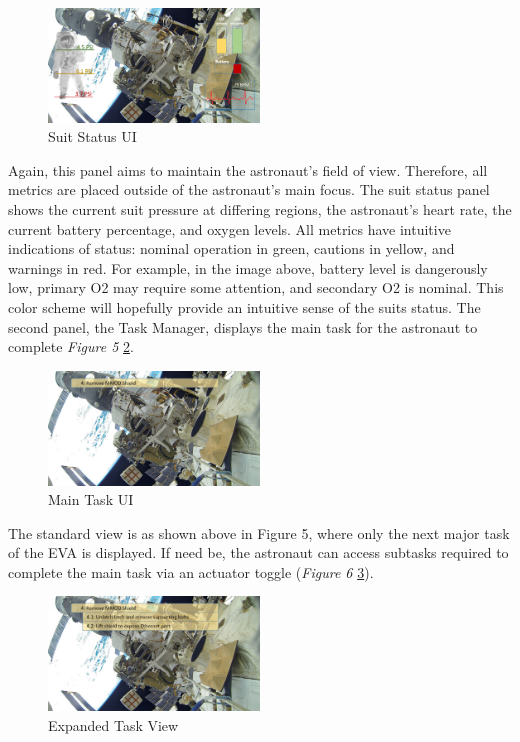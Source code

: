 \documentclass{article}
\begin{document}
\begin{figure}[!htb]
  \centering
  \includegraphics[width=0.5\textwidth]{assets/moresuitmetrics.png}
  \caption{Suit Status UI}
  \label{fig:moresuitmetrics}
\end{figure}

Again, this panel aims to maintain the astronaut’s field of view. 
Therefore, all metrics are placed outside of the astronaut’s main focus. 
The suit status panel shows the current suit pressure at differing 
regions, the astronaut’s heart rate, the current battery percentage, and 
oxygen levels. All metrics have intuitive indications of status: nominal 
operation in green, cautions in yellow, and warnings in red. For 
example, in the image above, battery level is dangerously low, primary 
O2 may require some attention, and secondary O2 is nominal. This color 
scheme will hopefully provide an intuitive sense of the suits status. 
The second panel, the Task Manager, displays the main task for the 
astronaut to complete \textit{Figure 5} \ref{fig:task4}.

\begin{figure}[!htb]
  \centering
  \includegraphics[width=0.5\textwidth]{assets/task4.png}
  \caption{Main Task UI}
  \label{fig:task4}
\end{figure}

The standard view is as shown above in Figure 5, where only the next 
major task of the EVA is displayed. If need be, the astronaut can access 
subtasks required to complete the main task via an actuator toggle 
(\textit{Figure 6} \ref{fig:moresubtasks}).

\begin{figure}[!htb]
  \centering
  \includegraphics[width=0.5\textwidth]{assets/moresubtasks.png}
  \caption{Expanded Task View}
  \label{fig:moresubtasks}
\end{figure}
\end{document}

